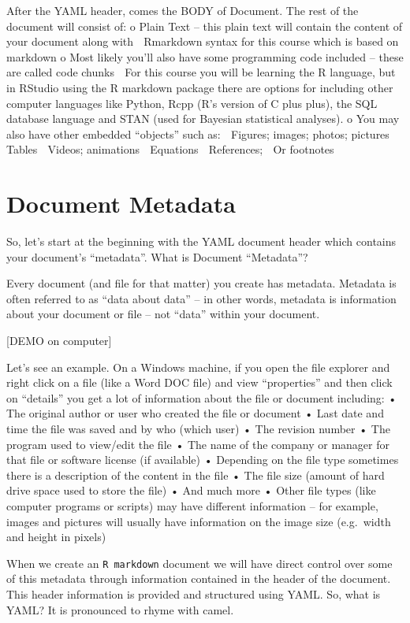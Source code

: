\documentclass[
]{book}
\begin{document}
After the YAML header, comes the BODY of Document. The rest of the document will consist of:
o Plain Text -- this plain text will contain the content of your document along with
 Rmarkdown syntax for this course which is based on markdown
o Most likely you'll also have some programming code included -- these are called code chunks
 For this course you will be learning the R language, but in RStudio using the R markdown package there are options for including other computer languages like Python, Rcpp (R's version of C plus plus), the SQL database language and STAN (used for Bayesian statistical analyses).
o You may also have other embedded ``objects'' such as:
 Figures; images; photos; pictures
 Tables
 Videos; animations
 Equations
 References;
 Or footnotes

\hypertarget{document-metadata}{%
\section{Document Metadata}\label{document-metadata}}

So, let's start at the beginning with the YAML document header which contains your document's ``metadata''. What is Document ``Metadata''?

Every document (and file for that matter) you create has metadata. Metadata is often referred to as ``data about data'' -- in other words, metadata is information about your document or file -- not ``data'' within your document.

{[}DEMO on computer{]}

Let's see an example. On a Windows machine, if you open the file explorer and right click on a file (like a Word DOC file) and view ``properties'' and then click on ``details'' you get a lot of information about the file or document including:
• The original author or user who created the file or document
• Last date and time the file was saved and by who (which user)
• The revision number
• The program used to view/edit the file
• The name of the company or manager for that file or software license (if available)
• Depending on the file type sometimes there is a description of the content in the file
• The file size (amount of hard drive space used to store the file)
• And much more
• Other file types (like computer programs or scripts) may have different information -- for example, images and pictures will usually have information on the image size (e.g.~width and height in pixels)

When we create an \texttt{R\ markdown} document we will have direct control over some of this metadata through information contained in the header of the document. This header information is provided and structured using YAML. So, what is YAML? It is pronounced to rhyme with camel.
\end{document}
